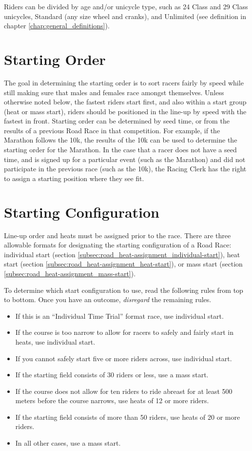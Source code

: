 Riders can be divided by age and/or unicycle type, such as 24 Class and 29 Class unicycles, Standard (any size wheel and cranks), and Unlimited (see
definition in chapter \ref{chap:general_definitions}).

\section{Starting Order}

The goal in determining the starting order is to sort racers fairly by speed while still making sure that males and females race amongst themselves.
Unless otherwise noted below, the fastest riders start first, and also within a start group (heat or mass start), riders should be positioned in the line-up by speed with the fastest in front.
Starting order can be determined by seed time, or from the results of a previous Road Race in that competition.
For example, if the Marathon follows the 10k, the results of the 10k can be used to determine the starting order for the Marathon.
In the case that a racer does not have a seed time, and is signed up for a particular event (such as the Marathon) and did not participate in the previous race (such as the 10k), the Racing Clerk has the right to assign a starting position where they see fit.

\section{Starting Configuration}

Line-up order and heats must be assigned prior to the race.
There are three allowable formats for designating the starting configuration of a Road Race: individual start (section \ref{subsec:road_heat-assignment_individual-start}), heat start (section \ref{subsec:road_heat-assignment_heat-start}), or mass start (section \ref{subsec:road_heat-assignment_mass-start}).

To determine which start configuration to use, read the following rules from top to bottom.
Once you have an outcome, \emph{disregard} the remaining rules.
\begin{itemize}
\item If this is an ``Individual Time Trial'' format race, use individual start.
\item If the course is too narrow to allow for racers to safely and fairly start in heats, use individual start.
\item If you cannot safely start five or more riders across, use individual start.
\item If the starting field consists of 30 riders or less, use a mass start.
\item If the course does not allow for ten riders to ride abreast for at least 500 meters before the course narrows, use heats of 12 or more riders.
\item If the starting field consists of more than 50 riders, use heats of 20 or more riders.
\item In all other cases, use a mass start.
\end{itemize}

